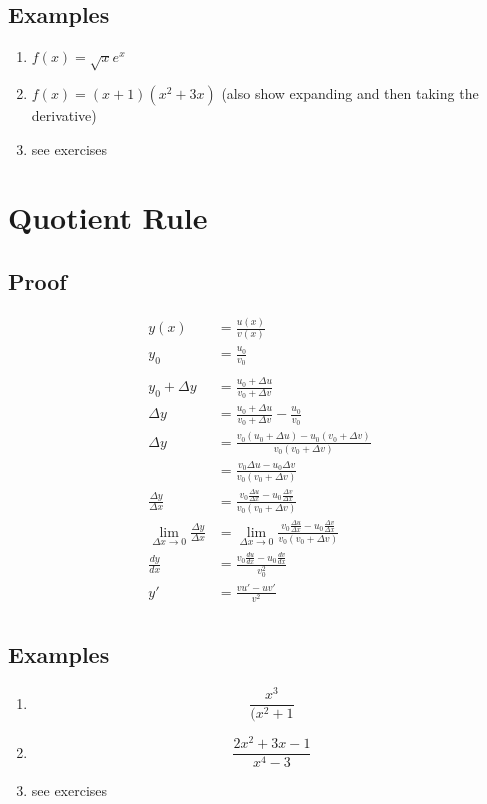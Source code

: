 \documentclass[letterpaper, landscape]{exam}
\begin{document}
  \subsection{Examples} %
  
  \begin{enumerate}
    \item $f(x) = \sqrt{x} e^x$

    \item $f(x) = (x + 1)(x^2 + 3x)$ (also show expanding and then taking the derivative)

    \item see exercises
  \end{enumerate}

  \section{Quotient Rule} %
  \label{sec:qr}
  
  \subsection{Proof} %
  
  \begin{align*}
    y(x)                      & = \frac{u(x)}{v(x)} \\
    y_0                       & = \frac{u_0}{v_0} \\
    \\
    y_0 + \Delta y            & = \frac{u_0 + \Delta u}{v_0 + \Delta v} \\
    \Delta y                  & = \frac{u_0 + \Delta u}{v_0 + \Delta v} - \frac{u_0}{v_0}\\
    \Delta y                  & = \frac{v_0 (u_0 + \Delta u) - u_0 (v_0 + \Delta v)}{v_0 (v_0 + \Delta v)}\\
                              & = \frac{v_0 \Delta u - u_0 \Delta v}{v_0 (v_0 + \Delta v)}\\
    \frac{\Delta y}{\Delta x} & = \frac{v_0 \frac{\Delta u}{\Delta x} - u_0 \frac{\Delta v}{\Delta x}}
                                                                         {v_0 (v_0 + \Delta v)} \\
    \lim_{\Delta x \to 0} \frac{\Delta y}{\Delta x} & = \lim_{\Delta x \to 0} \frac{v_0 \frac{\Delta u}{\Delta x} - u_0 \frac{\Delta v}{\Delta x}}
                                                                                     {v_0 (v_0 + \Delta v)}\\
    \frac{dy}{dx} & = \frac{v_0 \frac{du}{dx} - u_0 \frac{dv}{dx}}{v_0^2} \\
    y'            & = \frac{vu' - uv'}{v^2} \\
  \end{align*}

  \subsection{Examples} %
  
  \begin{enumerate}
    \item 
      \[
        \frac{x^3}{(x^2 + 1} 
      \]

    \item 
      \[
        \frac{2x^2 + 3x - 1}{x^4 - 3}
      \]

    \item see exercises

  \end{enumerate}
\end{document}
